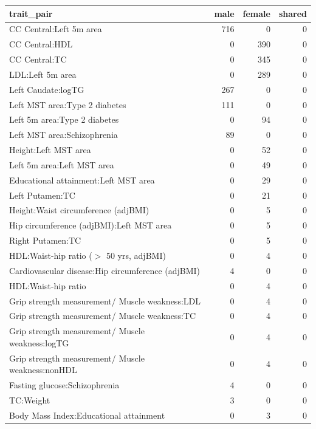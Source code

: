 \begin{table}[ht]
\centering
\begin{tabular}{lrrr}
  \hline
trait\_pair & male & female & shared \\ 
  \hline
CC Central:Left 5m area & 716 &   0 &   0 \\ 
  CC Central:HDL &   0 & 390 &   0 \\ 
  CC Central:TC &   0 & 345 &   0 \\ 
  LDL:Left 5m area &   0 & 289 &   0 \\ 
  Left Caudate:logTG & 267 &   0 &   0 \\ 
  Left MST area:Type 2 diabetes & 111 &   0 &   0 \\ 
  Left 5m area:Type 2 diabetes &   0 &  94 &   0 \\ 
  Left MST area:Schizophrenia &  89 &   0 &   0 \\ 
  Height:Left MST area &   0 &  52 &   0 \\ 
  Left 5m area:Left MST area &   0 &  49 &   0 \\ 
  Educational attainment:Left MST area &   0 &  29 &   0 \\ 
  Left Putamen:TC &   0 &  21 &   0 \\ 
  Height:Waist circumference (adjBMI) &   0 &   5 &   0 \\ 
  Hip circumference (adjBMI):Left MST area &   0 &   5 &   0 \\ 
  Right Putamen:TC &   0 &   5 &   0 \\ 
  HDL:Waist-hip ratio ($>$ 50 yrs, adjBMI) &   0 &   4 &   0 \\ 
  Cardiovascular disease:Hip circumference (adjBMI) &   4 &   0 &   0 \\ 
  HDL:Waist-hip ratio &   0 &   4 &   0 \\ 
  Grip strength measurement/ Muscle weakness:LDL &   0 &   4 &   0 \\ 
  Grip strength measurement/ Muscle weakness:TC &   0 &   4 &   0 \\ 
  Grip strength measurement/ Muscle weakness:logTG &   0 &   4 &   0 \\ 
  Grip strength measurement/ Muscle weakness:nonHDL &   0 &   4 &   0 \\ 
  Fasting glucose:Schizophrenia &   4 &   0 &   0 \\ 
  TC:Weight &   3 &   0 &   0 \\ 
  Body Mass Index:Educational attainment &   0 &   3 &   0 \\ 

\end{tabular}
\end{table}
